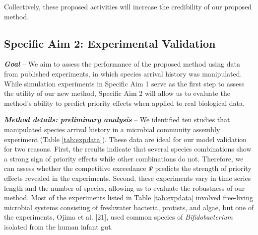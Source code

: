 \documentclass[12pt, class=article, crop=false]{standalone}
\begin{document}
Collectively, these proposed activities will increase the credibility of our proposed method.

\subsection*{Specific Aim 2: Experimental Validation}

\textbf{\textit{Goal}} -- 
We aim to assess the performance of the proposed method using data from published experiments, in which species arrival history was manipulated.
While simulation experiments in Specific Aim 1 serve as the first step to assess the utility of our new method, Specific Aim 2 will allow us to evaluate the method's ability to predict priority effects when applied to real biological data.

\textit{\textbf{Method details: preliminary analysis}} --
We identified ten studies that manipulated species arrival history in a microbial community assembly experiment (Table \ref{tab:expdata}).
These data are ideal for our model validation for two reasons.
First, the results indicate that several species combinations show a strong sign of priority effects while other combinations do not.
Therefore, we can assess whether the competitive exceedance $\Psi$ predicts the strength of priority effects revealed in the experiments.
Second, these experiments vary in time series length and the number of species, allowing us to evaluate the robustness of our method. 
Most of the experiments listed in Table \ref{tab:expdata} involved free-living microbial systems consisting of freshwater bacteria, protists, and algae, but one of the experiments, Ojima et al. [21], used common species of \textit{Bifidobacterium} isolated from the human infant gut. 
\end{document}
